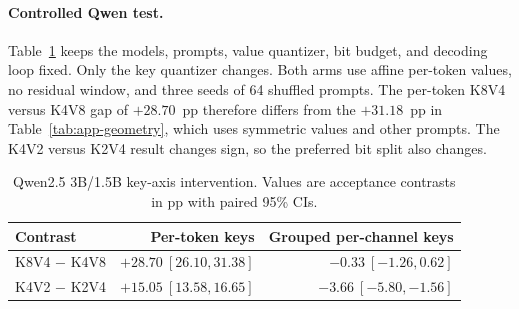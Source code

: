 \documentclass{article}
\begin{document}
\begin{table}[ht]
  \centering
  \small
  \caption{Acceptance contrasts in pp. ``Shift'' is grouped
  per-channel minus per-token. Brackets give paired 95\% CIs for each
  within-pair contrast.}
  \label{tab:app-geometry}
\end{table}

\paragraph{Controlled Qwen test.}
Table~\ref{tab:app-factorial} keeps the models, prompts, value quantizer, bit
budget, and decoding loop fixed. Only the key quantizer changes. Both arms use
affine per-token values, no residual window, and three seeds of 64 shuffled
prompts. The per-token K8V4 versus K4V8 gap of $+28.70$~pp therefore differs
from the $+31.18$~pp in Table~\ref{tab:app-geometry}, which uses symmetric
values and other prompts. The K4V2
versus K2V4 result changes sign, so the preferred bit split also changes.

\begin{table}[ht]
  \centering
  \small
  \caption{Qwen2.5 3B/1.5B key-axis intervention. Values are acceptance
  contrasts in pp with paired 95\% CIs.}
  \label{tab:app-factorial}
  \begin{tabular}{lrr}
    \toprule
    Contrast & Per-token keys & Grouped per-channel keys \\
    \midrule
    K8V4 $-$ K4V8 & $+28.70\ [26.10,31.38]$ & $-0.33\ [-1.26,0.62]$ \\
    K4V2 $-$ K2V4 & $+15.05\ [13.58,16.65]$ & $-3.66\ [-5.80,-1.56]$ \\
    \bottomrule
  \end{tabular}
\end{table}
\end{document}
